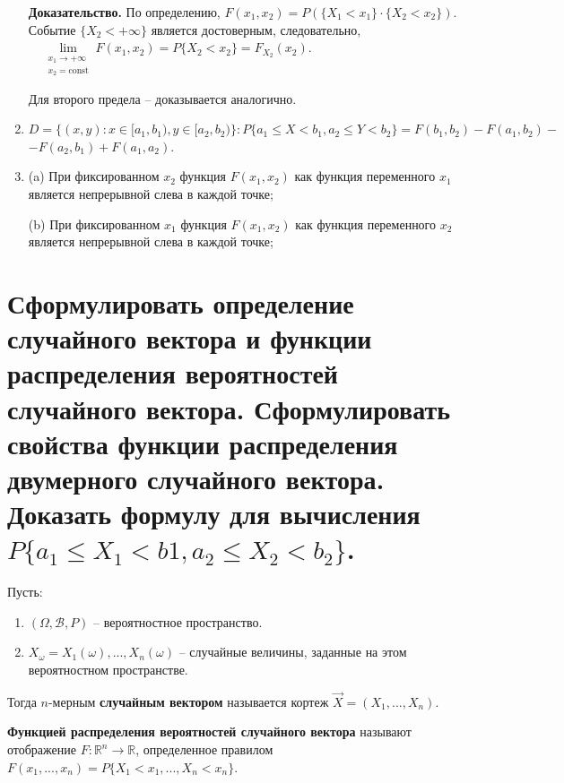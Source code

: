 \begin{enumerate}
		\textbf{Доказательство.} По определению, \( F(x_1, x_2) = P(\{X_1 < x_1\} \cdot \{X_2 < x_2\})\). Событие $\{X_2 < +\infty\}$ является достоверным, следовательно, $\quad \lim\limits_{{\substack{x_1 \to +\infty \\ x_2 = \text{const}}}} F(x_1, x_2) = P\{X_2 < x_2\} = F_{X_2}(x_2)$. 
		
		Для второго предела -- доказывается аналогично.
		
	\item $D = \{(x, y): x \in [a_1, b_1), y \in [a_2, b_2)\}: P\{a_1 \leq X < b_1, a_2 \leq Y < b_2\} = F(b_1, b_2) - F(a_1, b_2) -$ $-F(a_2, b_1) + F(a_1, a_2)$.
	
	\item (a) При фиксированном $x_2$ функция $F(x_1, x_2)$ как функция переменного $x_1$
	является непрерывной слева в каждой точке;
	
	(b) При фиксированном $x_1$ функция $F(x_1, x_2)$ как функция переменного $x_2$
	является непрерывной слева в каждой точке;
	
\end{enumerate}


\section{Сформулировать определение случайного вектора и функции распределения вероятностей случайного вектора. Сформулировать свойства функции распределения двумерного случайного вектора. Доказать формулу для вычисления $P\{a_1 \leq X_1 < b1, a_2 \leq X_2 < b_2\}$.}

Пусть: 
\begin{enumerate}
	\item $(\Omega, \mathcal{B}, P)$ -- вероятностное пространство.
	
	\item $X_{\omega} = X_1(\omega),...,X_n(\omega)$ -- случайные величины, заданные на этом вероятностном пространстве.
\end{enumerate}
Тогда $n$-мерным \textbf{случайным вектором} называется кортеж $\vec{X} = (X_1,..., X_n)$.

\textbf{Функцией распределения вероятностей случайного вектора} называют отображение $F: \mathbb{R}^n \rightarrow \mathbb{R}$, определенное правилом $F(x_1, ..., x_n) = P\{X_1 < x_1,..., X_n < x_n\}$.

